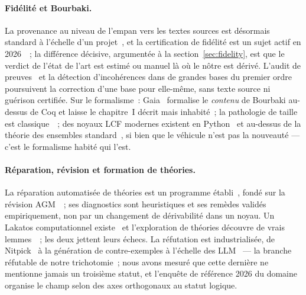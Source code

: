 \documentclass[11pt]{article}
\theoremstyle{remark}\newtheorem{example}{Exemple}
\begin{document}
\paragraph{Fidélité et Bourbaki.}
La provenance au niveau de l'empan vers les textes sources est désormais standard à
l'échelle d'un projet~\cite{m2f2026,proofnet2023}, et la certification de fidélité est
un sujet actif en 2026~\cite{faithfulnessgap2026,formalrx2026}~; la différence
décisive, argumentée à la section~\ref{sec:fidelity}, est que le verdict de l'état de
l'art est estimé ou manuel là où le nôtre est dérivé. L'audit de
preuves~\cite{adams2016auditing} et la détection d'incohérences dans de grandes bases
du premier ordre~\cite{schulz2017inconsistencies} poursuivent la correction d'une base
pour elle-même, sans texte source ni guérison certifiée. Sur le formalisme~:
Gaia~\cite{grimm2010gaia} formalise le \emph{contenu} de Bourbaki au-dessus de Coq et
laisse le chapitre~I décrit mais inhabité~; la pathologie de taille est
classique~\cite{mathias2002term}~; des noyaux LCF modernes existent en
Python~\cite{knuckledragger} et au-dessus de la théorie des ensembles
standard~\cite{guilloud2023lisa}, si bien que le véhicule n'est pas la nouveauté ---
c'est le formalisme habité qui l'est.

\paragraph{Réparation, révision et formation de théories.}
La réparation automatisée de théories est un programme
établi~\cite{li2022abc,li2022entrenchment,troquard2018weakening}, fondé sur la révision
AGM~\cite{agm1985}~; ses diagnostics sont heuristiques et ses remèdes validés
empiriquement, non par un changement de dérivabilité dans un noyau. Un Lakatos
computationnel existe~\cite{pease2007lakatos} et l'exploration de théories découvre de
vrais lemmes~\cite{johansson2014hipster}~; les deux jettent leurs échecs. La réfutation
est industrialisée, de Nitpick~\cite{blanchette2011nitpick} à la génération de
contre-exemples à l'échelle des LLM~\cite{learningtodisprove2026} --- la branche
réfutable de notre trichotomie~; nous avons mesuré que cette dernière ne mentionne
jamais un troisième statut, et l'enquête de référence 2026 du
domaine~\cite{conjecturingsurvey2026} organise le champ selon des axes orthogonaux au
statut logique.
\end{document}

